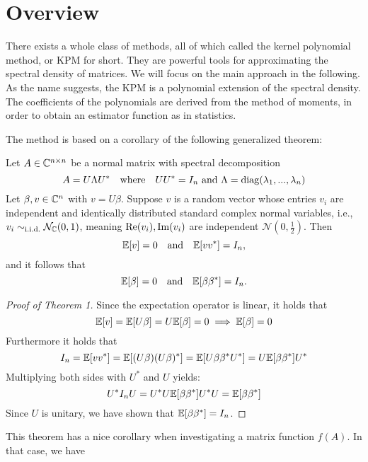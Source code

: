 \section{Overview}
There exists a whole class of methods, all of which called the kernel polynomial method, or KPM for short.
They are powerful tools for approximating the spectral density of matrices.
We will focus on the main approach in the following.\\
As the name suggests, the KPM is a polynomial extension of the spectral density.
The coefficients of the polynomials are derived from the method of moments,
in order to obtain an estimator function as in statistics.

The method is based on a corollary of the following generalized theorem:

\begin{theorem}
    Let $A \in \mathbb{C}^{n \times n}$ be a normal matrix with spectral decomposition
    \[
    A = U \Lambda U^* \quad \text{where} \quad UU^* = I_n \text{ and } \Lambda = \operatorname{diag}(\lambda_1, ..., \lambda_n)
    \]
    Let $\beta, v \in \mathbb{C}^n$ with $v = U\beta$.
    Suppose $v$ is a random vector whose entries $v_i$ are independent and identically distributed standard complex normal variables,
    i.e., $v_i \sim_\text{i.i.d.} \mathcal{N}_{\mathbb{C}}(0, 1)$, meaning $\operatorname{Re}(v_i), \operatorname{Im}(v_i)$ are independent $\mathcal{N}(0, \frac{1}{2})$.
    Then
    \begin{equation} \label{eq:complex_normal_vector}
        \mathbb{E}[v] = 0 \quad \text{and} \quad \mathbb{E}[v v^*] = I_n,
    \end{equation}
    and it follows that
    \[
    \mathbb{E}[\beta] = 0 \quad \text{and} \quad \mathbb{E}[\beta \beta^*] = I_n.
    \]
\end{theorem}


\begin{proof}[Proof of Theorem 1]
    Since the expectation operator is linear, it holds that
    \[
    \mathbb{E}[v] = \mathbb{E}[U\beta] = U\mathbb{E}[\beta] = 0 \implies \mathbb{E}[\beta] = 0
    \]
    Furthermore it holds that
    \[
    I_n = \mathbb{E}[vv^*] = \mathbb{E}[(U\beta)(U\beta)^*] = \mathbb{E}[U\beta \beta^*U^*] = U \mathbb{E}[\beta \beta^*]U^*
    \]
    Multiplying both sides with $U^*$ and $U$ yields:
    \[
    U^* I_n U = U^* U \mathbb{E}[\beta \beta^*]U^* U = \mathbb{E}[\beta \beta^*]
    \]
    Since $U$ is unitary, we have shown that $\mathbb{E}[\beta \beta^*] = I_n$.
\end{proof}


\vspace{0.5 cm}
This theorem has a nice corollary when investigating a matrix function $f(A)$.
In that case, we have

